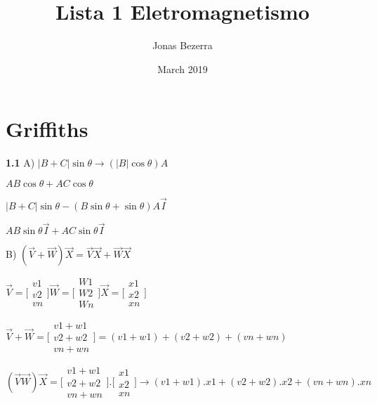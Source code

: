 \documentclass{article}
\title{Lista 1 Eletromagnetismo}
\author{Jonas Bezerra }
\date{March 2019}
\begin{document}
\maketitle

\section{Griffiths}

\noindent\textbf{1.1}\newline
\noindent A) $|B+C|\sin\theta \rightarrow (|B|\cos\theta)A $

$AB \cos\theta + AC\cos\theta$

$|B+C|\sin\theta -(B\sin\theta + \sin\theta)A \vec I$

$AB\sin\theta \vec I + AC \sin\theta \vec I$\newline\newline

\noindent B)
$(\vec V + \vec W)\vec X = \vec V \vec X + \vec W \vec X$

$\vec V = \Bigg[ \begin{array}{c}
     v1 \\
     v2 \\
     vn

\end{array}{}\Bigg] 
\vec W = \Bigg[ \begin{array}{c}
     W1 \\
     W2 \\
     Wn

\end{array}{}\Bigg] 
\vec X = \Bigg[ \begin{array}{c}
     x1 \\
     x2 \\
     xn

\end{array}{}\Bigg] $


$\vec V + \vec W = 
\Bigg[ \begin{array}{c}
     v1+w1 \\
     v2+w2 \\
     vn+wn
\end{array}{}\Bigg]
= (v1+w1) + (v2+w2) + (vn+wn)$


$(\vec V \vec W)\vec X = 
\Bigg[ \begin{array}{c}
     v1+w1 \\
     v2+w2 \\
     vn+wn

\end{array}{}\Bigg] 
.\Bigg[ \begin{array}{c}
     x1 \\
     x2 \\
     xn

\end{array}{}\Bigg] 
\rightarrow (v1+w1).x1 + (v2+w2).x2 + (vn+wn).xn
$\newline\newline
\end{document}
